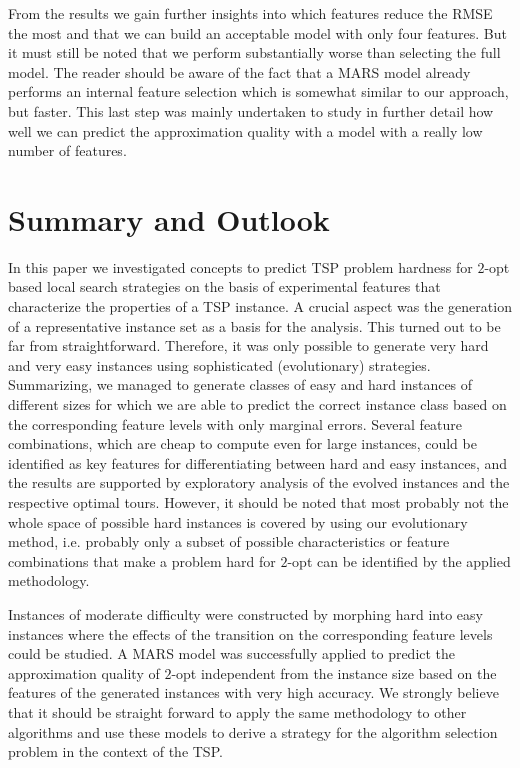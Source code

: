 \documentclass{article}
\begin{document}
From the results we gain further insights into which features reduce
the RMSE the most and that we can build an acceptable model with only
four features. But it must still be noted that we perform
substantially worse than selecting the full model. The reader should
be aware of the fact that a MARS model already performs an internal
feature selection which is somewhat similar to our approach, but
faster. This last step was mainly undertaken to study in further
detail how well we can predict the approximation quality with a model
with a really low number of features.

\section{Summary and Outlook}\label{sec:conc}

In this paper we investigated concepts to predict TSP problem hardness
for $2$-opt based local search strategies on the basis of experimental
features that characterize the properties of a TSP instance. A crucial
aspect was the generation of a representative instance set as a basis
for the analysis. This turned out to be far from
straightforward. Therefore, it was only possible to generate very hard
and very easy instances using sophisticated (evolutionary) strategies.
Summarizing, we managed to generate classes of easy and hard instances
of different sizes for which we are able to predict the correct
instance class based on the corresponding feature levels with only
marginal errors.  Several feature combinations, which are cheap to
compute even for large instances, could be identified as key features
for differentiating between hard and easy instances, and the results
are supported by exploratory analysis of the evolved instances and the
respective optimal tours. However, it should be noted that most
probably not the whole space of possible hard instances is covered by
using our evolutionary method, i.e.  probably only a subset of
possible characteristics or feature combinations that make a problem
hard for $2$-opt can be identified by the applied methodology.

Instances of moderate difficulty were constructed by morphing hard
into easy instances where the effects of the transition on the
corresponding feature levels could be studied. A MARS model was
successfully applied to predict the approximation quality of $2$-opt
independent from the instance size based on the features of the
generated instances with very high accuracy. We strongly believe that
it should be straight forward to apply the same methodology to other
algorithms and use these models to derive a strategy for the algorithm
selection problem in the context of the TSP.
\end{document}
